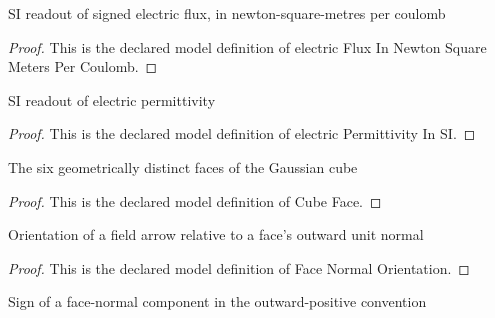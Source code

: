 \begin{definition}
  \label{def:physics:phyx-mini-0840:phyxminiproblems-problemphyxmini0840-electricfluxinnewtonsquaremeterspercoulomb}
  SI readout of signed electric flux, in newton-square-metres per coulomb
\end{definition}
\begin{proof}
  This is the declared model definition of electric Flux In Newton Square Meters Per Coulomb.
\end{proof}
\begin{definition}
  \label{def:physics:phyx-mini-0840:phyxminiproblems-problemphyxmini0840-electricpermittivityinsi}
  SI readout of electric permittivity
\end{definition}
\begin{proof}
  This is the declared model definition of electric Permittivity In SI.
\end{proof}
\begin{definition}
  \label{def:physics:phyx-mini-0840:phyxminiproblems-problemphyxmini0840-cubeface}
  The six geometrically distinct faces of the Gaussian cube
\end{definition}
\begin{proof}
  This is the declared model definition of Cube Face.
\end{proof}
\begin{definition}
  \label{def:physics:phyx-mini-0840:phyxminiproblems-problemphyxmini0840-facenormalorientation}
  Orientation of a field arrow relative to a face's outward unit normal
\end{definition}
\begin{proof}
  This is the declared model definition of Face Normal Orientation.
\end{proof}
\begin{definition}
  \label{def:physics:phyx-mini-0840:phyxminiproblems-problemphyxmini0840-orientationsign}
  Sign of a face-normal component in the outward-positive convention
\end{definition}
